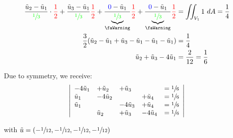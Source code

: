 \begin{align*}
    \frac{\utild_2 - \utild_1}{\color{green}\sfrac{1}{3}}\cdot{\color{red}\frac{1}{2}}
    + \frac{\utild_3 - \utild_1}{\color{green}\sfrac{1}{3}}{\color{red}\frac{1}{2}}
    + \frac{{\color{blue}0} - \utild_1}{\underbrace{\color{green}\sfrac{1}{3}}_\text{\faWarning}}{\color{red}\frac{1}{2}}
    + \frac{{\color{blue}0} - \utild_1}{\underbrace{\color{green}\sfrac{1}{3}}_\text{\faWarning}}{\color{red}\frac{1}{2}}
    & = \iint_{V_1} 1\ dA = \frac{1}{4} \\
    \frac{3}{2}(\utild_2 - \utild_1 + \utild_3 - \utild_1 - \utild_1 - \utild_1) & = \frac{1}{4} \\
    \utild_2 + \utild_3 - 4\utild_1 & = \frac{2}{12} = \frac{1}{6}
\end{align*}

Due to symmetry, we receive:
\begin{align*}
    \left|
    \begin{array}{llllr}
        -4\tilde{u}_1 & + \tilde{u}_2 & + \tilde{u}_3 & & = \sfrac{1}{6} \\
        \tilde{u}_1   & -4\tilde{u}_2 & & + \tilde{u}_4 & = \sfrac{1}{6} \\
        \tilde{u}_1 & & -4\tilde{u}_3 & + \tilde{u}_4 & = \sfrac{1}{6} \\
        & \tilde{u}_2 & + \tilde{u}_3 & -4\tilde{u}_4 & = \sfrac{1}{6}
    \end{array}
    \right|
\end{align*}

with $\tilde{u} = (-\sfrac{1}{12}, -\sfrac{1}{12}, -\sfrac{1}{12}, -\sfrac{1}{12})$














































